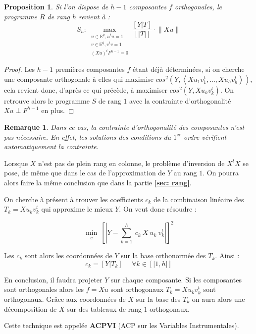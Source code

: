 \documentclass[12pt, openany, fleqn, french]{article}
\newtheorem*{remark}{Remarque}
\newtheorem{prop}[theo]{Proposition}    %
\begin{document}
\begin{prop}
    Si l'on dispose de $h-1$ composantes $f$ orthogonales, le programme $R$ de rang $h$ revient à :
    $$ S_h : \displaystyle 
    \max_{\substack{u \in \mathbb{R}^p, u^tu = 1\\ 
    v \in \mathbb{R}^{q}, v^tv=1\\ 
    (Xu)^tF^{h-1}=0}}
    \frac{[Y|T]}{[|T|]} \cdot\lVert Xu\rVert
$$
    
\end{prop}

\begin{proof}
Les $h-1$ premières composantes $f$ étant déjà déterminées, si on cherche une composante orthogonale à elles qui maximise $cos^2(Y, \left\langle Xu_1v_1^t,...,Xu_hv_h^t \right\rangle)$, cela revient donc, d'après ce qui précède, à maximiser $cos^2(Y,Xu_kv_k^t)$. On retrouve alors le programme $S$ de rang $1$ avec la contrainte d'orthogonalité $Xu \perp F^{h-1}$ en plus. 
\end{proof}

\begin{remark}
    Dans ce cas, la contrainte d'orthogonalité des composantes n'est pas nécessaire. En effet, les solutions des conditions du $1^{\text{er}}$ ordre vérifient automatiquement la contrainte.
\end{remark}


Lorsque $X$ n'est pas de plein rang en colonne, le problème d'inversion de $X^tX$ se pose, de même que dans le cas de l'approximation de $Y$ au rang $1$. On pourra alors faire la même conclusion que dans la partie \textbf{\ref{sec: rang}}.

On cherche à présent à trouver les coefficients $c_k$ de la combinaison linéaire des $T_k = Xu_kv_k^t$ qui approxime le mieux $Y$. On veut donc résoudre :

$$  \displaystyle 
    \min_{\substack{c}}~[|Y - \sum_{k=1}^h~c_k~X~u_k~v_k^t|]^2
$$

Les $c_k$ sont alors les coordonnées de $Y$ sur la base orthonormée des $T_k$. Ainsi : $$c_k = [Y|T_k] ~~~~~~\forall k \in [|1,h|]$$

En conclusion, il faudra projeter $Y$ sur chaque composante. Si les composantes sont orthogonales alors les $f = Xu$ sont orthogonaux $T_k=Xu_kv_k^t$ sont orthogonaux. Grâce aux coordonnées de $X$ sur la base des $T_k$ on aura alors une décomposition de $X$ sur des tableaux de rang $1$ orthogonaux. 

Cette technique est appelée \textbf{ACPVI} (ACP sur les Variables Instrumentales).
\end{document}
